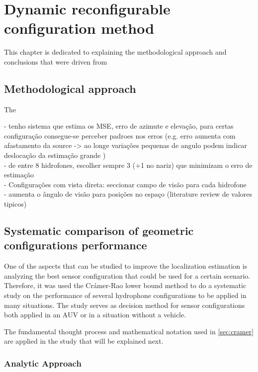 \chapter{Dynamic reconfigurable configuration method}  \label{chap:study}



This chapter is dedicated to explaining the methodological approach and conclusions that were driven from 

\section{Methodological approach} \label{sec:config-perf}

The

- tenho sistema que estima os MSE, erro de azimute e elevação, para certas configuração consegue-se perceber padroes nos erros (e.g. erro aumenta com afastamento da source -> ao longe variações pequenas de angulo podem indicar deslocação da estimação grande )
\\
- de entre 8 hidrofones, escolher sempre 3 (+1 no nariz) que minimizam o erro de estimação
\\
- Configurações com vista direta: seccionar campo de visão para cada hidrofone
\\
- aumenta o ângulo de visão para posições no espaço (literature review de valores tipicos)

\section{Systematic comparison of geometric configurations performance} \label{sec:analysis_config_performance}

One of the aspects that can be studied to improve the localization estimation is analyzing the best sensor configuration that could be used for a certain scenario. Therefore, it was used the Crámer-Rao lower bound method to do a systematic study on the performance of several hydrophone configurations to be applied in many situations. The study serves as decision method for sensor configurations both applied in an AUV or in a situation without a vehicle. 

The fundamental thought process and mathematical notation used in \ref{sec:cramer} are applied in the study that will be explained next.

\subsection{Analytic Approach}  

